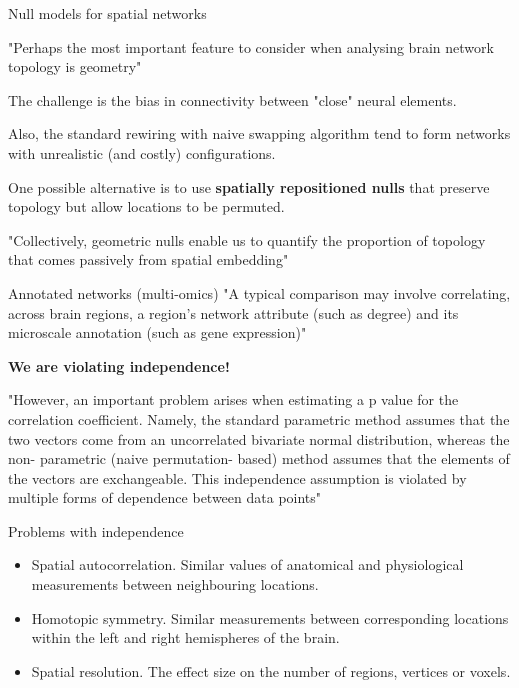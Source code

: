 \documentclass{beamer}
\begin{document}
	\begin{frame}{Null models for spatial networks}
		
		"Perhaps the most important feature to consider when
		analysing brain network topology is geometry"
		
		The challenge is the bias in connectivity between "close" neural elements.
		
		Also, the standard rewiring with naive swapping algorithm tend to form networks with unrealistic (and costly) configurations. 
		
		One possible alternative is to use \textbf{spatially repositioned nulls} that preserve topology but allow locations to be permuted. 
		
		"Collectively, geometric nulls enable us to quantify the
		proportion of topology that comes passively from spatial
		embedding"
		
	\end{frame}
\begin{frame}{Annotated networks (multi-omics)}
	"A typical comparison may
	involve correlating, across brain regions, a region’s
	network attribute (such as degree) and its microscale
	annotation (such as gene expression)"
	
	\textbf{We are violating independence!}
	
	"However, an important problem arises when
	estimating a p value for the correlation coefficient.
	Namely, the standard parametric method assumes that
	the two vectors come from an uncorrelated bivariate
	normal distribution, whereas the non- parametric (naive
	permutation- based) method assumes that the elements
	of the vectors are exchangeable. This independence
	assumption is violated by multiple forms of dependence
	between data points"

\end{frame}
\begin{frame}{Problems with independence}	
	\begin{itemize}
		\item Spatial autocorrelation. Similar values of anatomical
	and physiological measurements between neighbouring
	locations. 
	\item Homotopic symmetry. Similar measurements between corresponding locations
	within the left and right hemispheres of the brain. 
	\item Spatial resolution. The effect size on the
	number of regions, vertices or voxels.
	\end{itemize}
	
\end{frame}
\end{document}
